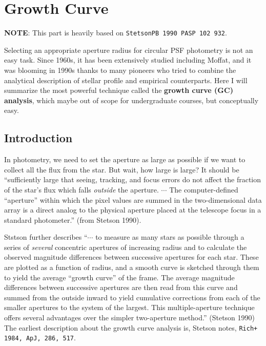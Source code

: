 \chapter{Growth Curve}

\textbf{NOTE}: This part is heavily based on \texttt{StetsonPB 1990 PASP 102 932}.

Selecting an appropriate aperture radius for circular PSF photometry is not an easy task. Since 1960s, it has been extensively studied including Moffat, and it was blooming in 1990s thanks to many pioneers who tried to combine the analytical description of stellar profile and empirical counterparts. Here I will summarize the most powerful technique called the \textbf{growth curve (GC) analysis}, which maybe out of scope for undergraduate courses, but conceptually easy. 

\section{Introduction}
In photometry, we need to set the aperture as large as possible if we want to collect all the flux from the star. But wait, how large is large? It should be ``sufficiently large that seeing, tracking, and focus errors do not affect the fraction of the star's flux which falls \textit{outside} the aperture. $ \cdots $ The computer-defined ``aperture'' within which the pixel values are summed in the two-dimensional data array is a direct analog to the physical aperture placed at the telescope focus in a standard photometer.'' (from Stetson 1990). 

Ststson further describes ``$ \cdots $ to measure as many stars as possible through a series of \textit{several} concentric apertures of increasing radius and to calculate the observed magnitude differences between successive apertures for each star. These are plotted as a function of radius, and a smooth curve is sketched through them to yield the average ``growth curve'' of the frame. The average magnitude differences between successive apertures are then read from this curve and summed from the outside inward to yield cumulative corrections from each of the smaller apertures to the system of the largest. This multiple-aperture technique offers several advantages over the simpler two-aperture method.'' (Stetson 1990) The earliest description about the growth curve analysis is, Stetson notes, \texttt{Rich+ 1984, ApJ, 286, 517}.

